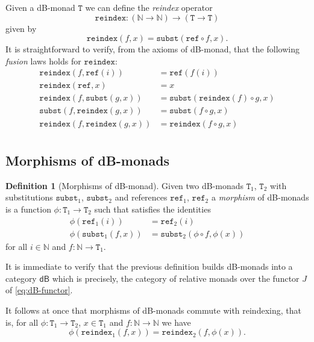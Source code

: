 \documentclass[a4paper,twoside,12pt]{article}
\theoremstyle{definition}
\newtheorem{definition}{Definition}
\theoremstyle{remark}
\theoremstyle{example}
\newcommand{\NN}{\mathbb{N}}
\newcommand{\TT}{\mathtt{T}}
\newcommand{\subst}{\mathtt{subst}}
\newcommand{\refe}{\mathtt{ref}}
\newcommand{\reindex}{\mathtt{reindex}}
\begin{document}
Given a dB-monad $\TT$ we can define the \emph{reindex} operator
\begin{equation*}
  \reindex\colon (\NN \to \NN) \to (\TT \to \TT)
\end{equation*}
given by
\begin{equation*}
  \reindex(f,x) = \subst(\refe \circ f, x).
\end{equation*}
It is straightforward to verify, from the axioms of dB-monad, that the
following \emph{fusion} laws holds for $\reindex$:
\begin{align*}
  \reindex(f,\refe(i)) &= \refe(f(i)) \\
  \reindex(\refe,x) &= x \\
  \reindex(f,\subst(g,x)) &= \subst(\reindex(f) \circ g, x) \\
  \subst(f,\reindex(g,x)) &= \subst(f \circ g,x) \\
  \reindex(f,\reindex(g,x)) &= \reindex(f\circ g, x) \\
\end{align*}

\subsection{Morphisms of dB-monads}
\label{sec:morphisms-db-monads}

\begin{definition}[Morphisms of dB-monad]
  Given two dB-monads $\TT_1$, $\TT_2$ with substitutions $\subst_1$,
  $\subst_2$ and references $\refe_1$, $\refe_2$ a \emph{morphism} of
  dB-monads is a function $\phi\colon \TT_1 \to \TT_2$ such that
  satisfies the  identities
  \begin{align*}
    \phi(\refe_1(i)) &= \refe_2(i) \\
    \phi(\subst_1(f,x)) &= \subst_2(\phi \circ f, \phi(x))
  \end{align*}
  for all $i \in \NN$ and $f\colon \NN \to \TT_1$.
\end{definition}

It is immediate to verify that the previous definition builds
dB-monads into a category $\mathsf{dB}$ which is precisely, the
category of relative monads over the functor $J$ of
\eqref{eq:dB-functor}.

It follows at once that morphisms of dB-monads commute with
reindexing, that is, for all $\phi\colon \TT_1 \to \TT_2$,
$x\in \TT_1$ and $f\colon \NN\to \NN$ we have
\begin{equation*}
  \phi(\reindex_1(f,x)) = \reindex_2(f,\phi(x)) .
\end{equation*}
\end{document}
